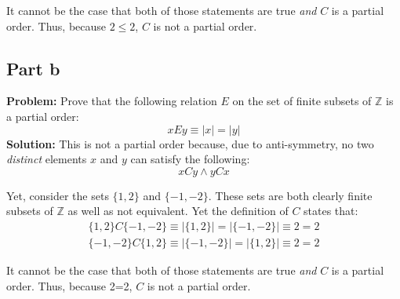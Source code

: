 \documentclass{article}
\begin{document}
It cannot be the case that both of those statements are true \textit{and} $C$ is a partial order. Thus, because $2\le2$, $C$ is not a partial order.

\subsection*{Part b}
\textbf{Problem:} Prove that the following relation $E$ on the set of finite subsets of $\mathbb Z$ is a partial order:
$$xEy\equiv |x|=|y|$$
\textbf{Solution:} This is not a partial order because, due to anti-symmetry, no two \textit{distinct} elements $x$ and $y$ can satisfy the following:
$$xCy\wedge yCx$$

Yet, consider the sets $\{1,2\}$ and $\{-1,-2\}$. These sets are both clearly finite subsets of $\mathbb Z$ as well as not equivalent. Yet the definition of $C$ states that:
\begin{gather*}
  \{1,2\}C\{-1,-2\}\equiv |\{1,2\}|=|\{-1,-2\}|\equiv 2= 2\\
  \{-1,-2\}C\{1,2\}\equiv |\{-1,-2\}|=|\{1,2\}|\equiv 2= 2
\end{gather*}

It cannot be the case that both of those statements are true \textit{and} $C$ is a partial order. Thus, because 2=2, $C$ is not a partial order.
\end{document}
